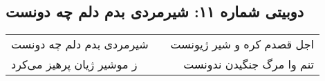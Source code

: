 \begin{center}
\section*{دوبیتی شماره ۱۱: شیرمردی بدم دلم چه دونست}
\label{sec:011}
\begin{longtable}{l p{0.5cm} r}
شیرمردی بدم دلم چه دونست
&&
اجل قصدم کره و شیر ژیونست
\\
ز موشیر ژیان پرهیز می‌کرد
&&
تنم وا مرگ جنگیدن ندونست
\\
\end{longtable}
\end{center}
